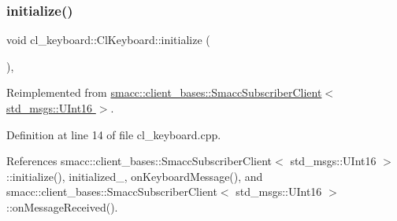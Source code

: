 \subsubsection{\texorpdfstring{initialize()}{initialize()}}
{\footnotesize\ttfamily void cl\+\_\+keyboard\+::\+Cl\+Keyboard\+::initialize (\begin{DoxyParamCaption}{ }\end{DoxyParamCaption})\hspace{0.3cm}{\ttfamily [override]}, {\ttfamily [virtual]}}



Reimplemented from \hyperlink{classsmacc_1_1client__bases_1_1SmaccSubscriberClient_af188f0f5e89de26a07e1f964cdd23a70}{smacc\+::client\+\_\+bases\+::\+Smacc\+Subscriber\+Client$<$ std\+\_\+msgs\+::\+U\+Int16 $>$}.



Definition at line 14 of file cl\+\_\+keyboard.\+cpp.



References smacc\+::client\+\_\+bases\+::\+Smacc\+Subscriber\+Client$<$ std\+\_\+msgs\+::\+U\+Int16 $>$\+::initialize(), initialized\+\_\+, on\+Keyboard\+Message(), and smacc\+::client\+\_\+bases\+::\+Smacc\+Subscriber\+Client$<$ std\+\_\+msgs\+::\+U\+Int16 $>$\+::on\+Message\+Received().


